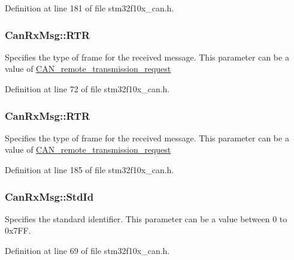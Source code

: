 Definition at line 181 of file stm32f10x\+\_\+can.\+h.

\subsubsection[{\texorpdfstring{R\+TR}{RTR}}]{ Can\+Rx\+Msg\+::\+R\+TR}\hypertarget{struct_can_rx_msg_a513971b0413990519a1c45d5afe9b0af}{}\label{struct_can_rx_msg_a513971b0413990519a1c45d5afe9b0af}
Specifies the type of frame for the received message. This parameter can be a value of \hyperlink{group___c_a_n__remote__transmission__request}{C\+A\+N\+\_\+remote\+\_\+transmission\+\_\+request} 

Definition at line 72 of file stm32f10x\+\_\+can.\+h.

\subsubsection[{\texorpdfstring{R\+TR}{RTR}}]{ Can\+Rx\+Msg\+::\+R\+TR}\hypertarget{struct_can_rx_msg_a9a183149a391a24f86da2ce895f0f1c9}{}\label{struct_can_rx_msg_a9a183149a391a24f86da2ce895f0f1c9}
Specifies the type of frame for the received message. This parameter can be a value of \hyperlink{group___c_a_n__remote__transmission__request}{C\+A\+N\+\_\+remote\+\_\+transmission\+\_\+request} 

Definition at line 185 of file stm32f10x\+\_\+can.\+h.

\subsubsection[{\texorpdfstring{Std\+Id}{StdId}}]{ Can\+Rx\+Msg\+::\+Std\+Id}\hypertarget{struct_can_rx_msg_a626ff5c3d696476c786ca999d10f2fa0}{}\label{struct_can_rx_msg_a626ff5c3d696476c786ca999d10f2fa0}
Specifies the standard identifier. This parameter can be a value between 0 to 0x7\+FF. 

Definition at line 69 of file stm32f10x\+\_\+can.\+h.

